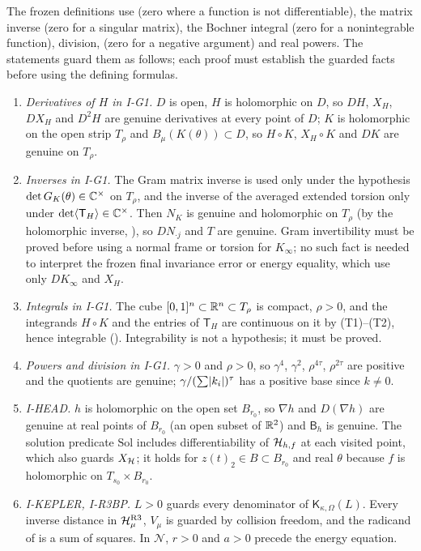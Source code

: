 \begin{remark}\label{bpI:p0:totality}
The frozen definitions use  (zero where a function is not differentiable), the matrix inverse
(zero for a singular matrix), the Bochner integral (zero for a nonintegrable function), division, 
(zero for a negative argument) and real powers. The statements guard them as follows; each proof must establish the
guarded facts before using the defining formulas.
\begin{enumerate}[label=(T\arabic*)]
\item \emph{Derivatives of $H$ in I-G1.} $D$ is open, $H$ is holomorphic on $D$, so $DH$, $X_H$, $DX_H$ and
  $D^2H$ are genuine derivatives at every point of $D$; $K$ is holomorphic on the open strip $T_\rho$ and
  $B_\mu(K(\theta))\subset D$, so $H\circ K$, $X_H\circ K$ and $DK$ are genuine on $T_\rho$.
\item \emph{Inverses in I-G1.} The Gram matrix inverse is used only under the hypothesis $\det G_K(\theta)\in\mathbb{C}^\times$
  on $T_\rho$, and the inverse of the averaged extended torsion only under $\det\langle \mathsf T_H\rangle\in\mathbb{C}^\times$. Then
  $N_K$ is genuine and holomorphic on $T_\rho$ (by the holomorphic inverse, ),
  so $DN_{\cdot j}$ and $T$ are genuine. Gram invertibility must be proved before using a normal frame or torsion for $K_\infty$; no such fact is
  needed to interpret the frozen final invariance error or energy equality, which use only $DK_\infty$ and $X_H$.
\item \emph{Integrals in I-G1.} The cube $[0,1]^n\subset\mathbb{R}^n\subset T_\rho$ is compact, $\rho>0$, and the integrands
  $H\circ K$ and the entries of $\mathsf T_H$ are continuous on it by (T1)--(T2), hence integrable
  (). Integrability is not a hypothesis; it must be proved.
\item \emph{Powers and division in I-G1.} $\gamma>0$ and $\rho>0$, so $\gamma^4$, $\gamma^2$, $\rho^{4\tau}$, $\rho^{2\tau}$
  are positive and the quotients are genuine; $\gamma/(\sum\lvert k_i\rvert)^\tau$ has a positive base since $k\ne0$.
\item \emph{I-HEAD.} $h$ is holomorphic on the open set $B_{r_0}$, so $\nabla h$ and $D(\nabla h)$ are genuine
  at real points of $B_{r_0}$ (an open subset of $\mathbb{R}^2$) and $\mathsf B_h$ is genuine. The solution predicate
  $\mathrm{Sol}$ includes differentiability of $\mathcal H_{h,f}$ at each visited point, which also guards $X_{\mathcal H}$; it holds
  for $z(t)_2\in B\subset B_{r_0}$ and real $\theta$ because $f$ is holomorphic on $T_{s_0}\times B_{r_0}$.
\item \emph{I-KEPLER, I-R3BP.} $L>0$ guards every denominator of $\mathsf K_{\kappa,\Omega}(L)$. Every inverse distance in
  $\mathcal H^{\mathrm{R3}}_\mu$, $V_\mu$ is guarded by collision freedom, and the radicand of  is a sum of squares.
  In $\mathcal N$, $r>0$ and $a>0$ precede the energy equation.
\end{enumerate}
\end{remark}

